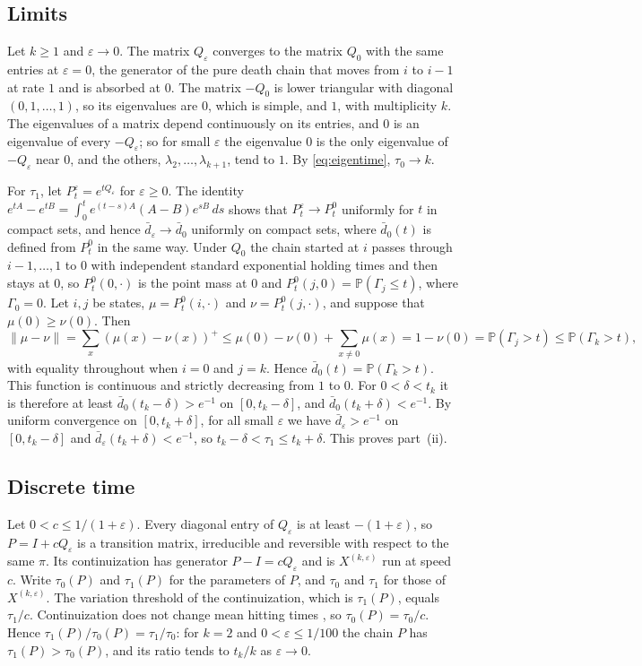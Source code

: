 \documentclass[11pt]{amsart}
\numberwithin{equation}{section}
\newcommand{\Pp}{\mathbb P}
\newcommand{\dbar}{\bar d}
\begin{document}
\subsection{Limits}
Let $k\ge1$ and $\varepsilon\to0$. The matrix $Q_\varepsilon$ converges to the matrix $Q_0$ with the same entries at $\varepsilon=0$, the generator of the pure death chain that moves from $i$ to $i-1$ at rate $1$ and is absorbed at $0$. The matrix $-Q_0$ is lower triangular with diagonal $(0,1,\dots,1)$, so its eigenvalues are $0$, which is simple, and $1$, with multiplicity $k$. The eigenvalues of a matrix depend continuously on its entries, and $0$ is an eigenvalue of every $-Q_\varepsilon$; so for small $\varepsilon$ the eigenvalue $0$ is the only eigenvalue of $-Q_\varepsilon$ near $0$, and the others, $\lambda_2,\dots,\lambda_{k+1}$, tend to $1$. By \eqref{eq:eigentime}, $\tau_0\to k$.

For $\tau_1$, let $P^\varepsilon_t=e^{tQ_\varepsilon}$ for $\varepsilon\ge0$. The identity $e^{tA}-e^{tB}=\int_0^te^{(t-s)A}(A-B)e^{sB}\,ds$ shows that $P^\varepsilon_t\to P^0_t$ uniformly for $t$ in compact sets, and hence $\dbar_\varepsilon\to\dbar_0$ uniformly on compact sets, where $\dbar_0(t)$ is defined from $P^0_t$ in the same way. Under $Q_0$ the chain started at $i$ passes through $i-1,\dots,1$ to $0$ with independent standard exponential holding times and then stays at $0$, so $P^0_t(0,\cdot)$ is the point mass at $0$ and $P^0_t(j,0)=\Pp(\Gamma_j\le t)$, where $\Gamma_0=0$. Let $i,j$ be states, $\mu=P^0_t(i,\cdot)$ and $\nu=P^0_t(j,\cdot)$, and suppose that $\mu(0)\ge\nu(0)$. Then
\[
\|\mu-\nu\|=\sum_x(\mu(x)-\nu(x))^+\le\mu(0)-\nu(0)+\sum_{x\ne0}\mu(x)=1-\nu(0)=\Pp(\Gamma_j>t)\le\Pp(\Gamma_k>t),
\]
with equality throughout when $i=0$ and $j=k$. Hence $\dbar_0(t)=\Pp(\Gamma_k>t)$. This function is continuous and strictly decreasing from $1$ to $0$. For $0<\delta<t_k$ it is therefore at least $\dbar_0(t_k-\delta)>e^{-1}$ on $[0,t_k-\delta]$, and $\dbar_0(t_k+\delta)<e^{-1}$. By uniform convergence on $[0,t_k+\delta]$, for all small $\varepsilon$ we have $\dbar_\varepsilon>e^{-1}$ on $[0,t_k-\delta]$ and $\dbar_\varepsilon(t_k+\delta)<e^{-1}$, so $t_k-\delta<\tau_1\le t_k+\delta$. This proves part~(ii).

\subsection{Discrete time}\label{sec:a-disc}
Let $0<c\le1/(1+\varepsilon)$. Every diagonal entry of $Q_\varepsilon$ is at least $-(1+\varepsilon)$, so $P=I+cQ_\varepsilon$ is a transition matrix, irreducible and reversible with respect to the same $\pi$. Its continuization has generator $P-I=cQ_\varepsilon$ and is $X^{(k,\varepsilon)}$ run at speed $c$. Write $\tau_0(P)$ and $\tau_1(P)$ for the parameters of $P$, and $\tau_0$ and $\tau_1$ for those of $X^{(k,\varepsilon)}$. The variation threshold of the continuization, which is $\tau_1(P)$, equals $\tau_1/c$. Continuization does not change mean hitting times \cite[Section~4.3.2]{AF}, so $\tau_0(P)=\tau_0/c$. Hence $\tau_1(P)/\tau_0(P)=\tau_1/\tau_0$: for $k=2$ and $0<\varepsilon\le1/100$ the chain $P$ has $\tau_1(P)>\tau_0(P)$, and its ratio tends to $t_k/k$ as $\varepsilon\to0$.
\end{document}
